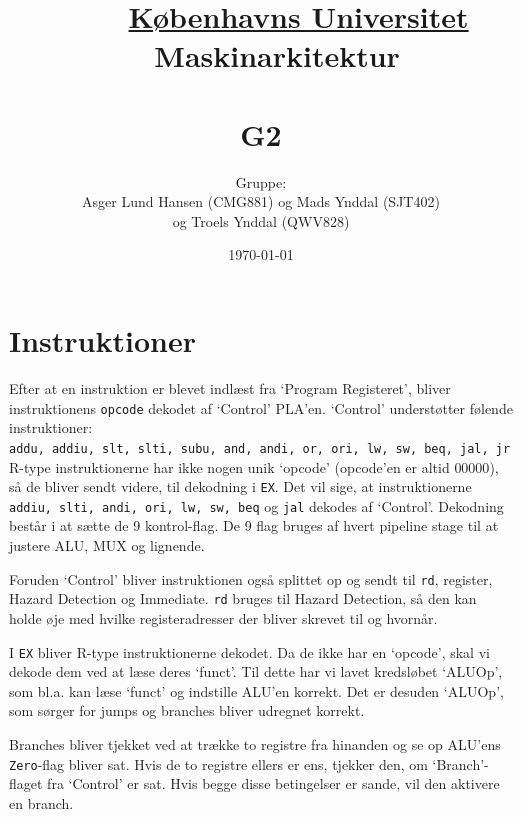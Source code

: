\documentclass[12pt, a4paper]{article}
\title{
  \vspace{-3em}
  {\Large \underline {Københavns Universitet}} \\
  {\Large Maskinarkitektur} \\ %
 \vspace{7em}
 \hrulefill \\
 { \huge \bfseries G2 \\[0.1cm] }
\hrulefill
}
\author{\Large {Gruppe:} \\ 
Asger Lund Hansen (CMG881) og Mads Ynddal (SJT402)\\ og Troels Ynddal (QWV828)
}
\date{
\vfill
\today
}
\begin{document}
\maketitle
\newpage

\section{Instruktioner}
Efter at en instruktion er blevet indlæst fra `Program Registeret', bliver instruktionens \texttt{opcode} dekodet af `Control' PLA'en. `Control' understøtter følende instruktioner:\\
\texttt{addu, addiu, slt, slti, subu, and, andi, or, ori, lw, sw, beq, jal, jr}\\

R-type instruktionerne har ikke nogen unik `opcode' (opcode'en er altid $00000$), så de bliver sendt videre, til dekodning i \texttt{EX}.
Det vil sige, at instruktionerne \texttt{addiu, slti, andi, ori, lw, sw, beq} og \texttt{jal} dekodes af `Control'. Dekodning består i at sætte de 9 kontrol-flag. De 9 flag bruges af hvert pipeline stage til at justere ALU, MUX og lignende. 

Foruden `Control' bliver instruktionen også splittet op og sendt til \texttt{rd}, register, Hazard Detection og Immediate. \texttt{rd} bruges til Hazard Detection, så den kan holde øje med hvilke registeradresser der bliver skrevet til og hvornår.

I \texttt{EX} bliver R-type instruktionerne dekodet. Da de ikke har en `opcode', skal vi dekode dem ved at læse deres `funct'. Til dette har vi lavet kredsløbet `ALUOp', som bl.a. kan læse `funct' og indstille ALU'en korrekt. Det er desuden `ALUOp', som sørger for jumps og branches bliver udregnet korrekt.

Branches bliver tjekket ved at trække to registre fra hinanden og se op ALU'ens \texttt{Zero}-flag bliver sat. Hvis de to registre ellers er ens, tjekker den, om `Branch'-flaget fra `Control' er sat. Hvis begge disse betingelser er sande, vil den aktivere en branch.
\end{document}
